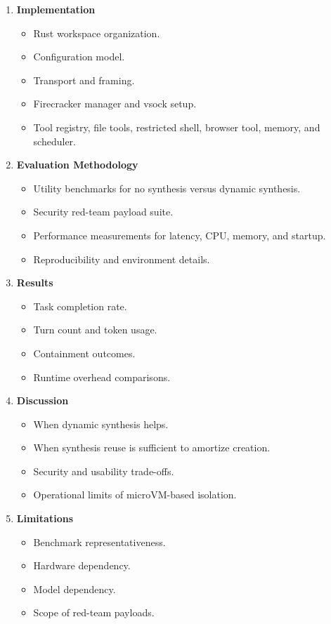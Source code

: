 \begin{enumerate}
    \item \textbf{Implementation}
    \begin{itemize}
        \item Rust workspace organization.
        \item Configuration model.
        \item Transport and framing.
        \item Firecracker manager and vsock setup.
        \item Tool registry, file tools, restricted shell, browser tool, memory,
        and scheduler.
    \end{itemize}

    \item \textbf{Evaluation Methodology}
    \begin{itemize}
        \item Utility benchmarks for no synthesis versus dynamic synthesis.
        \item Security red-team payload suite.
        \item Performance measurements for latency, CPU, memory, and startup.
        \item Reproducibility and environment details.
    \end{itemize}

    \item \textbf{Results}
    \begin{itemize}
        \item Task completion rate.
        \item Turn count and token usage.
        \item Containment outcomes.
        \item Runtime overhead comparisons.
    \end{itemize}

    \item \textbf{Discussion}
    \begin{itemize}
        \item When dynamic synthesis helps.
        \item When synthesis reuse is sufficient to amortize creation.
        \item Security and usability trade-offs.
        \item Operational limits of microVM-based isolation.
    \end{itemize}

    \item \textbf{Limitations}
    \begin{itemize}
        \item Benchmark representativeness.
        \item Hardware dependency.
        \item Model dependency.
        \item Scope of red-team payloads.
    \end{itemize}


\end{enumerate}
